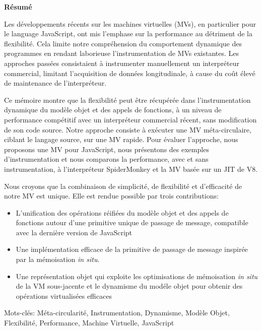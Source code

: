 
\begin{center}
\textbf{\large R\'esum\'e}
\end{center}


\vspace{1cm}
Les d\'eveloppements r\'ecents sur les machines virtuelles (MVs), en particulier
pour le language JavaScript, ont mis l'emphase sur la performance au d\'etriment
de la flexibilit\'e. Cela limite notre compr\'ehension du comportement dynamique
des programmes en rendant laborieuse l'instrumentation de MVs existantes. Les
approches pass\'ees consistaient \`a instrumenter manuellement un interpr\'eteur
commercial, limitant l'acquisition de donn\'ees longitudinale, \`a cause du co\^ut
\'elev\'e de maintenance de l'interpr\'eteur.
			
Ce m\'emoire montre que la flexibilit\'e peut \^etre r\'ecup\'er\'ee dans l'instrumentation
dynamique du mod\`ele objet et des appels de fonctions, \`a un niveau de
performance comp\'etitif avec un interpr\'eteur commercial r\'ecent, sans
modification de son code source. Notre approche consiste \`a ex\'ecuter une MV
m\'eta-circulaire, ciblant le langage source, sur une MV rapide. Pour \'evaluer
l'approche, nous proposons une MV pour JavaScript, nous pr\'esentons des exemples
d'instrumentation et nous comparons la performance, avec et sans
instrumentation, \`a l'interpr\'eteur SpiderMonkey et la MV bas\'ee sur un JIT de V8.
			
Nous croyons que la combinaison de simplicit\'e, de flexibilit\'e et d'efficacit\'e
de notre MV est unique. Elle est rendue possible par trois contributions:

\begin{itemize}
    \item L'unification des op\'erations r\'eifi\'ees du mod\`ele objet et des appels
        de fonctions autour d'une primitive unique de passage de message,
        compatible avec la derni\`ere version de JavaScript
    \item Une impl\'ementation efficace de la primitive de passage de message
        inspir\'ee par la m\'emoisation \textit{in situ}.
    \item Une repr\'esentation objet qui exploite les optimisations de
        m\'emoisation \textit{in situ} de la VM sous-jacente et le dynamisme du mod\'ele
        objet pour obtenir des op\'erations virtualis\'ees efficaces 
\end{itemize}

Mots-cl\'es: M\'eta-circularit\'e, Instrumentation, Dynamisme, Mod\`ele Objet,
Flexibilit\'e, Performance, Machine Virtuelle, JavaScript  
